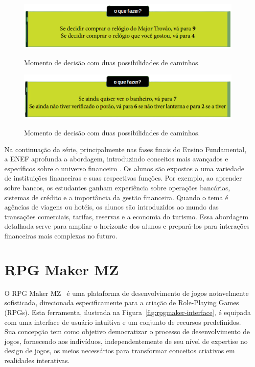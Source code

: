 \begin{figure}[ht]
	\centering
	\caption{Momento de decisão com duas possibilidades de caminhos.}
	\includegraphics[scale=0.75]{Textuais/Pictures/Picture2.png}
	\label{fig:figure-2}
\end{figure}

\begin{figure}[ht]
	\centering
	\caption{Momento de decisão com duas possibilidades de caminhos.}
	\includegraphics[scale=0.75]{Textuais/Pictures/Picture3.png}
	\label{fig:figure-3}
\end{figure}

Na continuação da série, principalmente nas fases finais do Ensino Fundamental, a ENEF aprofunda a abordagem, introduzindo conceitos mais avançados e específicos sobre o universo financeiro \cite{ENEF_EM}. Os alunos são expostos a uma variedade de instituições financeiras e suas respectivas funções. Por exemplo, ao aprender sobre bancos, os estudantes ganham experiência sobre operações bancárias, sistemas de crédito e a importância da gestão financeira. Quando o tema é agências de viagens ou hotéis, os alunos são introduzidos ao mundo das transações comerciais, tarifas, reservas e a economia do turismo. Essa abordagem detalhada serve para ampliar o horizonte dos alunos e prepará-los para interações financeiras mais complexas no futuro.

\section{RPG Maker MZ}

O RPG Maker MZ~\cite{RPGMakerMZ} é uma plataforma de desenvolvimento de jogos notavelmente sofisticada, direcionada especificamente para a criação de Role-Playing Games (RPGs). Esta ferramenta, ilustrada na Figura~\ref{fig:rpgmaker-interface}, é equipada com uma interface de usuário intuitiva e um conjunto de recursos predefinidos. Sua concepção tem como objetivo democratizar o processo de desenvolvimento de jogos, fornecendo aos indivíduos, independentemente de seu nível de expertise no design de jogos, os meios necessários para transformar conceitos criativos em realidades interativas.

